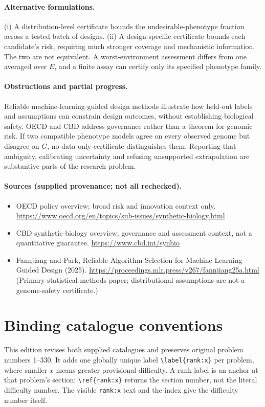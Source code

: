 \documentclass[11pt]{article}
\begin{document}
\paragraph{Alternative formulations.} (i) A distribution-level certificate bounds the undesirable-phenotype fraction across a tested batch of designs. (ii) A design-specific certificate bounds each candidate's risk, requiring much stronger coverage and mechanistic information. The two are not equivalent. A worst-environment assessment differs from one averaged over $E$, and a finite assay can certify only its specified phenotype family.

\paragraph{Obstructions and partial progress.} Reliable machine-learning-guided design methods illustrate how held-out labels and assumptions can constrain design outcomes, without establishing biological safety. OECD and CBD address governance rather than a theorem for genomic risk. If two compatible phenotype models agree on every observed genome but disagree on $G$, no data-only certificate distinguishes them. Reporting that ambiguity, calibrating uncertainty and refusing unsupported extrapolation are substantive parts of the research problem.

\paragraph{Sources (supplied provenance; not all rechecked).} \begin{itemize}
\item OECD policy overview; broad risk and innovation context only. \url{https://www.oecd.org/en/topics/sub-issues/synthetic-biology.html}
\item CBD synthetic-biology overview; governance and assessment context, not a quantitative guarantee. \url{https://www.cbd.int/synbio}
\item Fannjiang and Park, Reliable Algorithm Selection for Machine Learning-Guided Design (2025). \url{https://proceedings.mlr.press/v267/fannjiang25a.html} (Primary statistical methods paper; distributional assumptions are not a genome-safety certificate.)
\end{itemize}


\section*{Binding catalogue conventions}
This edition revises both supplied catalogues and preserves original problem numbers 1--330. It adds one globally unique label \verb|\label{rank:x}| per problem, where smaller $x$ means greater provisional difficulty. A rank label is an anchor at that problem's section: \verb|\ref{rank:x}| returns the section number, not the literal difficulty number. The visible \texttt{rank:x} text and the index give the difficulty number itself.
\end{document}
